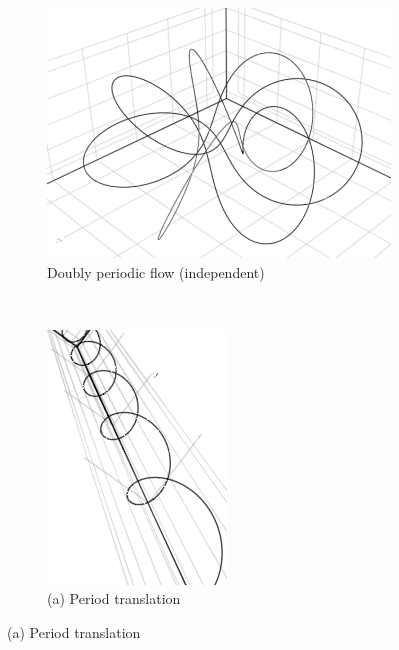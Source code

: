 \documentclass{juliacon}
\begin{document}
\begin{figure}[ht]
	\centering
	\begin{subfigure}[b]{0.3\textwidth}
		\includegraphics[width=\textwidth]{img/torus.png}
		\caption{Doubly periodic flow (independent)}
	\end{subfigure}
	~
	\begin{subfigure}[b]{0.15\textwidth}
		\includegraphics[width=\textwidth]{img/helix.png}
		\caption*{(a) Period translation}
	\end{subfigure}
\end{figure}
\end{document}
